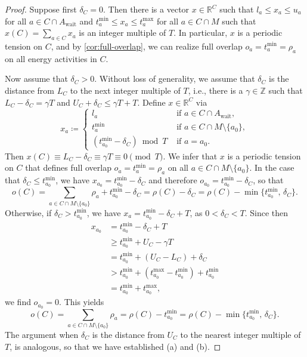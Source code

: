 \documentclass[11pt,a4paper]{article}
\newcommand{\wait}{\mathrm{wait}}
\newcommand{\energyact}{M}               %
\newcommand{\w}{\rho} %
\theoremstyle{definition}
\theoremstyle{remark}
\begin{document}
\begin{proof}    
    Suppose first $\delta_C = 0$. Then there is a vector $x \in \mathbb R^C$ such that $l_a \leq x_a \leq u_a$ for all $a \in C \cap A_\wait$ and $t_a^{\min} \leq x_a \leq t_a^{\max}$ for all $a \in C \cap \energyact$ such that $x(C) = \sum_{a \in C} x_a $ is an integer multiple of $T$. In particular, $x$ is a periodic tension on $C$, and by \cref{cor:full-overlap}, we can realize full overlap $o_a = t^{\min}_a = \w_a$ on all energy activities in $C$.

    Now assume that $\delta_C > 0$. Without loss of generality, we assume that $\delta_C$ is the distance from $L_C$ to the next integer multiple of $T$, i.e., there is a $\gamma \in \mathbb Z$ such that $L_C - \delta_C = \gamma T$ and $U_C + \delta_C \leq \gamma T + T$. Define $x \in \mathbb R^C$ via
    $$
    x_a \coloneqq \begin{cases}
        l_a & \text{ if } a \in C \cap A_\wait,\\
        t_a^{\min} & \text{ if } a \in C \cap \energyact \setminus\{a_0\},\\
        (t_{a_0}^{\min} - \delta_C) \bmod T & \text{ if } a = a_0.
    \end{cases}
    $$
    Then $x(C) \equiv L_C - \delta_C \equiv \gamma T \equiv 0 \pmod T$. We infer that $x$ is a periodic tension on $C$ that defines full overlap $o_a = t^{\min}_a = \w_a$ on all $a \in C \cap \energyact \setminus \{a_0\}$. In the case that $\delta_C \leq t_{a_0}^{\min}$, we have $x_{a_0} = t_{a_0}^{\min} - \delta_C$ and therefore $o_{a_0} = t_{a_0}^{\min} - \delta_C$, so that
    $$ o(C) = \sum_{a \in C \cap \energyact \setminus \{a_0\}} \w_a + t_{a_0}^{\min} - \delta_C = \w(C) - \delta_C = \w(C) - \min\{t_{a_0}^{\min},\, \delta_C\}.$$    
    Otherwise, if $\delta_C > t_{a_0}^{\min}$, we have $x_a = t_{a_0}^{\min} - \delta_C + T$, as $0 < \delta_C < T$. Since then
    \begin{align*}
    x_{a_0} &=  t_{a_0}^{\min} - \delta_C + T \\
    &\geq t_{a_0}^{\min} + U_C - \gamma T \\
    &= t_{a_0}^{\min} + (U_C - L_C) + \delta_C \\
    &> t_{a_0}^{\min} + (t_{a_0}^{\max} - t_{a_0}^{\min}) + t_{a_0}^{\min} \\
    &= t_{a_0}^{\min} + t_{a_0}^{\max},
    \end{align*}
    we find $o_{a_0} = 0$. This yields
    $$ o(C) = \sum_{a \in C \cap \energyact \setminus \{a_0\}} \w_a = \w(C) - t_{a_0}^{\min} = \w(C) - \min\{t_{a_0}^{\min},\, \delta_C\}.$$  
    The argument when $\delta_C$ is the distance from $U_C$ to the nearest integer multiple of $T$, is analogous, so that we have established (a) and (b).


\end{proof}
\end{document}
